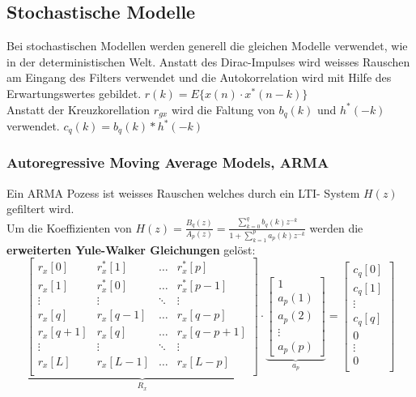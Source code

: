 \subsection{Stochastische Modelle}
Bei stochastischen Modellen werden generell die gleichen Modelle verwendet, wie in der deterministischen Welt. 
Anstatt des Dirac-Impulses wird weisses Rauschen am Eingang des Filters verwendet und die Autokorrelation wird mit Hilfe des Erwartungswertes gebildet. 
$r(k)=E\{x(n) \cdot x^*(n-k)\}$\\
Anstatt der Kreuzkorellation $r_{gx}$ wird die Faltung von $b_q(k)$ und $h^*(-k)$ verwendet. $c_q(k) = b_q(k) \ast h^*(-k)$

\subsubsection{Autoregressive Moving Average Models, ARMA }
Ein ARMA Pozess ist weisses Rauschen welches durch ein LTI- System $H(z)$ gefiltert wird.\\
Um die Koeffizienten von $H(z)=\frac{B_q(z)}{A_p(z)}=\frac{\sum\limits_{k=0}^q b_q(k)z^{-k}}{1+\sum\limits_{k=1}^p a_p(k)z^{-k}}$ werden 
die \textbf{erweiterten Yule-Walker Gleichungen} gelöst:
\small$$
\underbrace{\begin{bmatrix}               
    		r_x[0] & r_x^*[1] & \hdots & r_x^*[p] \\   
    		r_x[1] & r_x^*[0] & \hdots & r_x^*[p-1] \\   
    		\vdots & \vdots & \ddots & \vdots \\     
    		r_x[q] & r_x[q-1] & \hdots & r_x[q-p] \\   
    		r_x[q+1] & r_x[q] & \hdots & r_x[q-p+1] \\    
    		\vdots & \vdots & \ddots & \vdots \\     
    		r_x[L] & r_x[L-1] & \hdots & r_x[L-p] \\ 
		\end{bmatrix}  }_{R_x} \cdot \underbrace{\begin{bmatrix}
    		1\\
    		a_p(1) \\
    		a_p(2) \\
    		\vdots \\
    		a_p(p)
		\end{bmatrix}  }_{a_p}= \begin{bmatrix}
    		 c_q[0]\\            
    		 c_q[1]\\
    		\vdots \\
    		 c_q[q]\\
    		 0\\
    		\vdots \\
    		 0\\
		\end{bmatrix} 
		 $$ \normalsize

